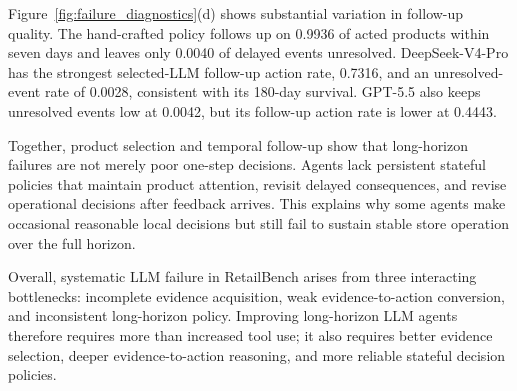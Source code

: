 Figure~\ref{fig:failure_diagnostics}(d) shows substantial variation in follow-up quality. The hand-crafted policy follows up on 0.9936 of acted products within seven days and leaves only 0.0040 of delayed events unresolved. DeepSeek-V4-Pro has the strongest selected-LLM follow-up action rate, 0.7316, and an unresolved-event rate of 0.0028, consistent with its 180-day survival. GPT-5.5 also keeps unresolved events low at 0.0042, but its follow-up action rate is lower at 0.4443.

Together, product selection and temporal follow-up show that long-horizon failures are not merely poor one-step decisions. Agents lack persistent stateful policies that maintain product attention, revisit delayed consequences, and revise operational decisions after feedback arrives. This explains why some agents make occasional reasonable local decisions but still fail to sustain stable store operation over the full horizon.

Overall, systematic LLM failure in RetailBench arises from three interacting bottlenecks: incomplete evidence acquisition, weak evidence-to-action conversion, and inconsistent long-horizon policy. Improving long-horizon LLM agents therefore requires more than increased tool use; it also requires better evidence selection, deeper evidence-to-action reasoning, and more reliable stateful decision policies.
\FloatBarrier
